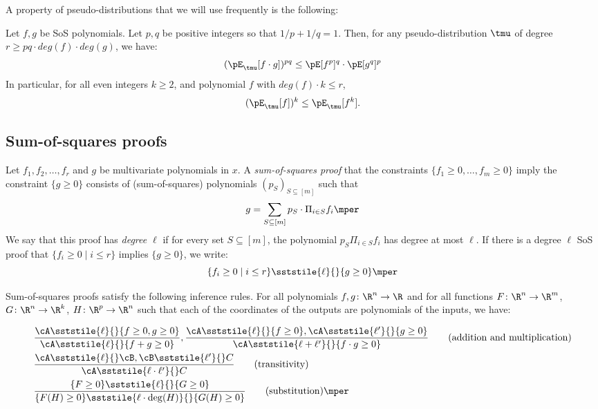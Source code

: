 A property of pseudo-distributions that we will use frequently is the following:
\begin{fact} \label{fact:pseudo-Holders}
Let $f,g$ be SoS polynomials. 
Let $p,q$ be positive integers so that $1/p + 1/q = 1$. 
Then, for any pseudo-distribution $\tmu$ of degree $r \geq pq \cdot deg(f) \cdot deg(g)$, we have:
\[
(\pE_{\tmu} [f \cdot g])^{pq} \leq \pE[f^{p}]^{q} \cdot \pE[g^{q}]^{p}
\]
In particular, for all even integers $k \geq 2$, and polynomial $f$ with $deg(f) \cdot k \leq r$, 
$$(\pE_{\tmu}[ f])^k \leq \pE_{\tmu}[f^k].$$
\end{fact}

\subsection{Sum-of-squares proofs}

Let $f_1, f_2, \ldots, f_r$ and $g$ be multivariate polynomials in $x$.
A \emph{sum-of-squares proof} that the constraints $\{f_1 \geq 0,
\ldots, f_m \geq 0\}$ imply the constraint $\{g \geq 0\}$ consists of
(sum-of-squares) polynomials $(p_S)_{S \subseteq [m]}$ such that
\begin{equation}
g = \sum_{S \subseteq [m]} p_S \cdot \Pi_{i \in S} f_i
\mper
\end{equation}
We say that this proof has \emph{degree $\ell$} if for every set $S \subseteq [m]$, the polynomial $p_S \Pi_{i \in S} f_i$ has degree at most $\ell$.
If there is a degree $\ell$ SoS proof that $\{f_i \geq 0 \mid i \leq r\}$ implies $\{g \geq 0\}$, we write:
\begin{equation}
  \{f_i \geq 0 \mid i \leq r\} \sststile{\ell}{}\{g \geq 0\}
  \mper
\end{equation}


Sum-of-squares proofs satisfy the following inference rules.
For all polynomials $f,g\colon\R^n \to \R$ and for all functions $F\colon \R^n \to \R^m$, $G\colon \R^n \to \R^k$, $H\colon \R^{p} \to \R^n$ such that each of the coordinates of the outputs are polynomials of the inputs, we have:

\begin{align}
&\frac{\cA \sststile{\ell}{} \{f \geq 0, g \geq 0 \} } {\cA \sststile{\ell}{} \{f + g \geq 0\}}, \frac{\cA \sststile{\ell}{} \{f \geq 0\}, \cA \sststile{\ell'}{} \{g \geq 0\}} {\cA \sststile{\ell+\ell'}{} \{f \cdot g \geq 0\}} \tag{addition and multiplication}\\
&\frac{\cA \sststile{\ell}{} \cB, \cB \sststile{\ell'}{} C}{\cA \sststile{\ell \cdot \ell'}{} C}  \tag{transitivity}\\
&\frac{\{F \geq 0\} \sststile{\ell}{} \{G \geq 0\}}{\{F(H) \geq 0\} \sststile{\ell \cdot \deg(H)} {} \{G(H) \geq 0\}} \tag{substitution}\mper
\end{align}

